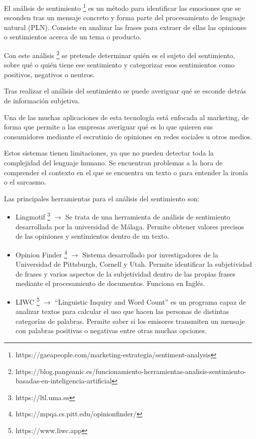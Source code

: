 El análisis de sentimiento \footnote{https://gaeapeople.com/marketing-estrategia/sentiment-analysis} es un método para identificar las emociones que se esconden tras un mensaje concreto y forma parte del procesamiento de lenguaje natural (PLN). Consiste en analizar las frases para extraer de ellas las opiniones o sentimientos acerca de un tema o producto.

Con este análisis \footnote{https://blog.pangeanic.es/funcionamiento-herramientas-analisis-sentimiento-basadas-en-inteligencia-artificial} se pretende determinar quién es el sujeto del sentimiento, sobre qué o quién tiene ese sentimiento y categorizar esos sentimientos como positivos, negativos o neutros.

Tras realizar el análisis del sentimiento se puede averiguar qué se esconde detrás de información subjetiva.

Una de las muchas aplicaciones de esta tecnología está enfocada al marketing, de forma que permite a las empresas averiguar qué es lo que quieren sus consumidores mediante el escrutinio de opiniones en redes sociales u otros medios.

Estos sistemas tienen limitaciones, ya que no pueden detectar toda la complejidad del lenguaje humano. Se encuentran problemas a la hora de comprender el contexto en el que se encuentra un texto o para entender la ironía o el sarcasmo.

Las principales herramientas para el análisis del sentimiento son:
\begin{itemize}
	\item Lingmotif \footnote{https://ltl.uma.es} $\rightarrow$ Se trata de una herramienta de análisis de sentimiento desarrollada por la universidad de Málaga. Permite obtener valores precisos de las opiniones y sentimientos dentro de un texto.
	\item Opinion Finder \footnote{https://mpqa.cs.pitt.edu/opinionfinder/} $\rightarrow$ Sistema desarrollado por investigadores de la Universidad de Pittsburgh, Cornell y Utah. Permite identificar la subjetividad de frases y varios aspectos de la subjetividad dentro de las propias frases mediante el procesamiento de documentos. Funciona en Inglés.
	\item LIWC \footnote{https://www.liwc.app} $\rightarrow$ ``Linguistic Inquiry and Word Count'' es un programa capaz de analizar textos para calcular el uso que hacen las personas de distintas categorías de palabras. Permite saber si los emisores transmiten un mensaje con palabras positivas o negativas entre otras muchas opciones.
\end{itemize}


